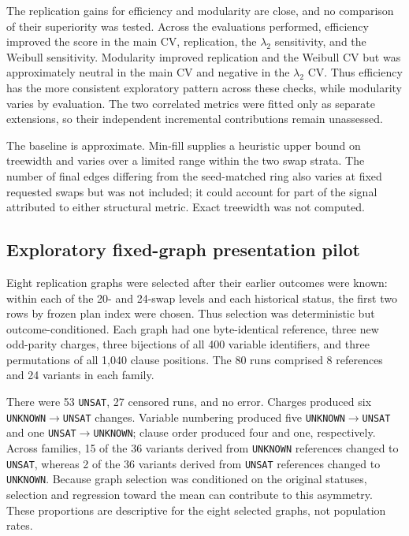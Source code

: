 \documentclass[11pt]{article}
\begin{document}
The replication gains for efficiency and modularity are close, and no comparison of their superiority was tested. Across the evaluations performed, efficiency improved the score in the main CV, replication, the $\lambda_2$ sensitivity, and the Weibull sensitivity. Modularity improved replication and the Weibull CV but was approximately neutral in the main CV and negative in the $\lambda_2$ CV. Thus efficiency has the more consistent exploratory pattern across these checks, while modularity varies by evaluation. The two correlated metrics were fitted only as separate extensions, so their independent incremental contributions remain unassessed.

The baseline is approximate. Min-fill supplies a heuristic upper bound on treewidth and varies over a limited range within the two swap strata. The number of final edges differing from the seed-matched ring also varies at fixed requested swaps but was not included; it could account for part of the signal attributed to either structural metric. Exact treewidth was not computed.

\subsection{Exploratory fixed-graph presentation pilot}
\label{sec:presentation}

Eight replication graphs were selected after their earlier outcomes were known: within each of the 20- and 24-swap levels and each historical status, the first two rows by frozen plan index were chosen. Thus selection was deterministic but outcome-conditioned. Each graph had one byte-identical reference, three new odd-parity charges, three bijections of all 400 variable identifiers, and three permutations of all 1,040 clause positions. The 80 runs comprised 8 references and 24 variants in each family.

There were 53 \texttt{UNSAT}, 27 censored runs, and no error. Charges produced six \texttt{UNKNOWN}$\to$\texttt{UNSAT} changes. Variable numbering produced five \texttt{UNKNOWN}$\to$\texttt{UNSAT} and one \texttt{UNSAT}$\to$\texttt{UNKNOWN}; clause order produced four and one, respectively. Across families, 15 of the 36 variants derived from \texttt{UNKNOWN} references changed to \texttt{UNSAT}, whereas 2 of the 36 variants derived from \texttt{UNSAT} references changed to \texttt{UNKNOWN}. Because graph selection was conditioned on the original statuses, selection and regression toward the mean can contribute to this asymmetry. These proportions are descriptive for the eight selected graphs, not population rates.
\end{document}
